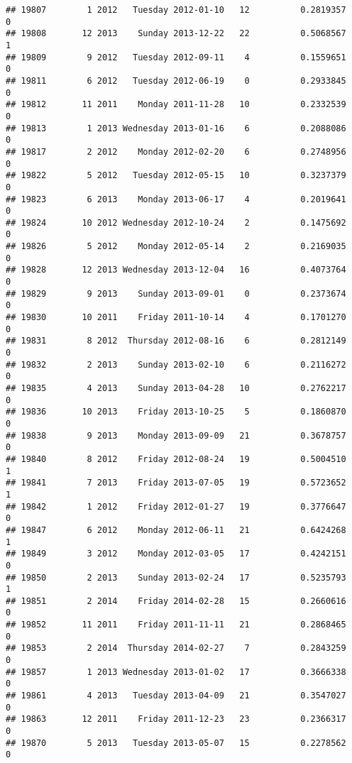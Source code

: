 \documentclass[
]{article}
\begin{document}
\begin{verbatim}
## 19807        1 2012   Tuesday 2012-01-10   12          0.2819357             0
## 19808       12 2013    Sunday 2013-12-22   22          0.5068567             1
## 19809        9 2012   Tuesday 2012-09-11    4          0.1559651             0
## 19811        6 2012   Tuesday 2012-06-19    0          0.2933845             0
## 19812       11 2011    Monday 2011-11-28   10          0.2332539             0
## 19813        1 2013 Wednesday 2013-01-16    6          0.2088086             0
## 19817        2 2012    Monday 2012-02-20    6          0.2748956             0
## 19822        5 2012   Tuesday 2012-05-15   10          0.3237379             0
## 19823        6 2013    Monday 2013-06-17    4          0.2019641             0
## 19824       10 2012 Wednesday 2012-10-24    2          0.1475692             0
## 19826        5 2012    Monday 2012-05-14    2          0.2169035             0
## 19828       12 2013 Wednesday 2013-12-04   16          0.4073764             0
## 19829        9 2013    Sunday 2013-09-01    0          0.2373674             0
## 19830       10 2011    Friday 2011-10-14    4          0.1701270             0
## 19831        8 2012  Thursday 2012-08-16    6          0.2812149             0
## 19832        2 2013    Sunday 2013-02-10    6          0.2116272             0
## 19835        4 2013    Sunday 2013-04-28   10          0.2762217             0
## 19836       10 2013    Friday 2013-10-25    5          0.1860870             0
## 19838        9 2013    Monday 2013-09-09   21          0.3678757             0
## 19840        8 2012    Friday 2012-08-24   19          0.5004510             1
## 19841        7 2013    Friday 2013-07-05   19          0.5723652             1
## 19842        1 2012    Friday 2012-01-27   19          0.3776647             0
## 19847        6 2012    Monday 2012-06-11   21          0.6424268             1
## 19849        3 2012    Monday 2012-03-05   17          0.4242151             0
## 19850        2 2013    Sunday 2013-02-24   17          0.5235793             1
## 19851        2 2014    Friday 2014-02-28   15          0.2660616             0
## 19852       11 2011    Friday 2011-11-11   21          0.2868465             0
## 19853        2 2014  Thursday 2014-02-27    7          0.2843259             0
## 19857        1 2013 Wednesday 2013-01-02   17          0.3666338             0
## 19861        4 2013   Tuesday 2013-04-09   21          0.3547027             0
## 19863       12 2011    Friday 2011-12-23   23          0.2366317             0
## 19870        5 2013   Tuesday 2013-05-07   15          0.2278562             0

\end{verbatim}
\end{document}
